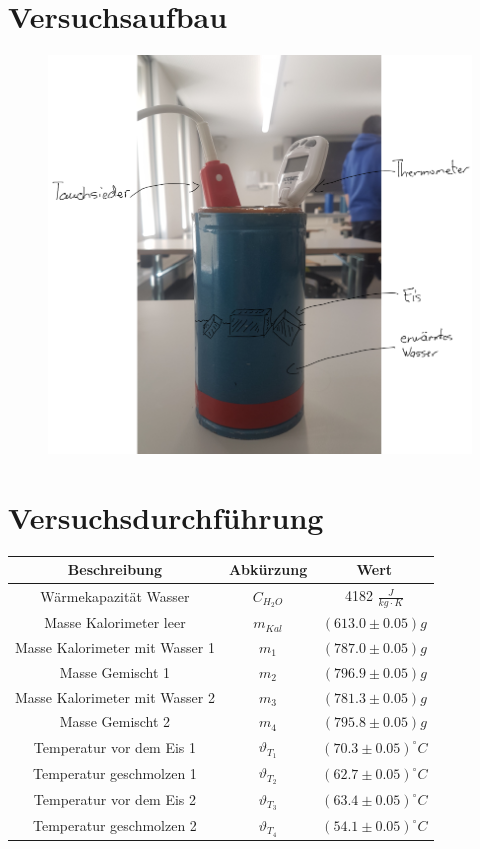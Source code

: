 \documentclass[a4 paper, 11pt]{article}
\begin{document}
\section{Versuchsaufbau}
\begin{figure}[H]
    \centering
    \includegraphics[width=\linewidth]{image}
\end{figure}

\section{Versuchsdurchführung}
\begin{table}[H]
    \centering
    \begin{tabular}{|c|c|c|}
        \hline
        \textbf{Beschreibung} & \textbf{Abkürzung} & \textbf{Wert} \\
        \hline
        Wärmekapazität Wasser & $C_{H_{2}O}$ & 4182 $\frac{J}{kg\cdot{}K}$\\
        \hline
        Masse Kalorimeter leer & $m_{Kal}$ & $(613.0\pm 0.05)g$\\
        Masse Kalorimeter mit Wasser 1 & $m_{1}$ & $(787.0\pm 0.05)g$\\
        \hline
        Masse Gemischt 1 & $m_{2}$ & $(796.9\pm 0.05)g$\\
        Masse Kalorimeter mit Wasser 2 & $m_{3}$ & $(781.3\pm 0.05)g$\\
    Masse Gemischt 2 & $m_{4}$ & $(795.8\pm 0.05)g$\\
        \hline
        Temperatur vor dem Eis 1 & $\vartheta_{T_{1}}$ & $(70.3\pm 0.05)^{\circ}C$\\
        Temperatur geschmolzen 1 & $\vartheta_{T_{2}}$ & $(62.7\pm 0.05) ^{\circ}C$\\
        \hline
        Temperatur vor dem Eis 2 & $\vartheta_{T_{3}}$ & $(63.4\pm 0.05)^{\circ}C$\\
        Temperatur geschmolzen 2 & $\vartheta_{T_{4}}$ & $(54.1\pm 0.05) ^{\circ}C$\\
        \hline
    \end{tabular}
\end{table}
\end{document}
